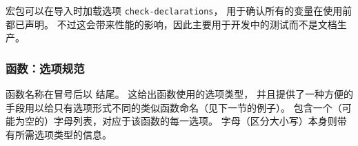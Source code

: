 \documentclass[full]{l3doc}
\begin{document}
%
 宏包可以在导入时加载选项 \texttt{check-declarations}，
用于确认所有的变量在使用前都已声明。
不过这会带来性能的影响，因此主要用于开发中的测试而不是文档生产。

%
\subsubsection{函数：选项规范}

%
函数名称在冒号后以  结尾。
这给出函数使用的选项类型，
并且提供了一种方便的手段用以给只有选项形式不同的类似函数命名（见下一节的例子）。
%
 包含一个（可能为空的）字母列表，对应于该函数的每一选项。
字母（区分大小写）本身则带有所需选项类型的信息。
\end{document}
